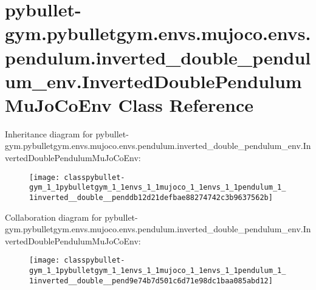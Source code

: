 \hypertarget{classpybullet-gym_1_1pybulletgym_1_1envs_1_1mujoco_1_1envs_1_1pendulum_1_1inverted__double__pende0cbd4e243b5fa20c9b42e2de7690554}{}\section{pybullet-\/gym.pybulletgym.\+envs.\+mujoco.\+envs.\+pendulum.\+inverted\+\_\+double\+\_\+pendulum\+\_\+env.\+Inverted\+Double\+Pendulum\+Mu\+Jo\+Co\+Env Class Reference}
\label{classpybullet-gym_1_1pybulletgym_1_1envs_1_1mujoco_1_1envs_1_1pendulum_1_1inverted__double__pende0cbd4e243b5fa20c9b42e2de7690554}


Inheritance diagram for pybullet-\/gym.pybulletgym.\+envs.\+mujoco.\+envs.\+pendulum.\+inverted\+\_\+double\+\_\+pendulum\+\_\+env.\+Inverted\+Double\+Pendulum\+Mu\+Jo\+Co\+Env\+:
\nopagebreak
\begin{figure}[H]
\begin{center}
\leavevmode
\texttt{[image: classpybullet-gym\_1\_1pybulletgym\_1\_1envs\_1\_1mujoco\_1\_1envs\_1\_1pendulum\_1\_1inverted\_\_double\_\_penddb12d21defbae88274742c3b9637562b]}
\end{center}
\end{figure}


Collaboration diagram for pybullet-\/gym.pybulletgym.\+envs.\+mujoco.\+envs.\+pendulum.\+inverted\+\_\+double\+\_\+pendulum\+\_\+env.\+Inverted\+Double\+Pendulum\+Mu\+Jo\+Co\+Env\+:
\nopagebreak
\begin{figure}[H]
\begin{center}
\leavevmode
\texttt{[image: classpybullet-gym\_1\_1pybulletgym\_1\_1envs\_1\_1mujoco\_1\_1envs\_1\_1pendulum\_1\_1inverted\_\_double\_\_pend9e74b7d501c6d71e98dc1baa085abd12]}
\end{center}
\end{figure}
